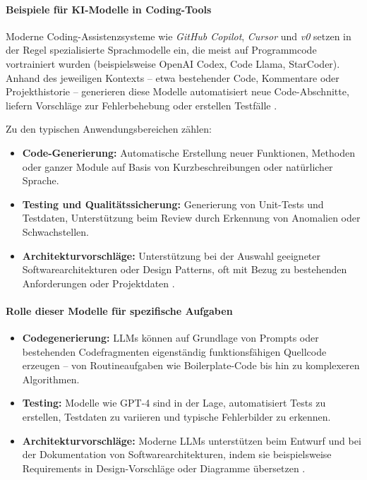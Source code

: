 \paragraph{Beispiele für KI-Modelle in Coding-Tools}

Moderne Coding-Assistenzsysteme wie \textit{GitHub Copilot}, \textit{Cursor}
und \textit{v0} setzen in der Regel spezialisierte Sprachmodelle ein, die meist
auf Programmcode vortrainiert wurden (beispielsweise OpenAI Codex, Code Llama,
StarCoder). Anhand des jeweiligen Kontexts – etwa bestehender Code, Kommentare
oder Projekthistorie – generieren diese Modelle automatisiert neue
Code-Abschnitte, liefern Vorschläge zur Fehlerbehebung oder erstellen Testfälle
\cite{coutinho_role_2024, esposito_generative_2025}.

Zu den typischen Anwendungsbereichen zählen:
\begin{itemize}
    \item \textbf{Code-Generierung:} Automatische Erstellung neuer Funktionen, Methoden oder ganzer Module auf Basis von Kurzbeschreibungen oder natürlicher Sprache.
    \item \textbf{Testing und Qualitätssicherung:} Generierung von Unit-Tests und Testdaten, Unterstützung beim Review durch Erkennung von Anomalien oder Schwachstellen.
    \item \textbf{Architekturvorschläge:} Unterstützung bei der Auswahl geeigneter Softwarearchitekturen oder Design Patterns, oft mit Bezug zu bestehenden Anforderungen oder Projektdaten \cite{esposito_generative_2025}.
\end{itemize}

\paragraph{Rolle dieser Modelle für spezifische Aufgaben}

\begin{itemize}
    \item \textbf{Codegenerierung:} LLMs können auf Grundlage von Prompts oder bestehenden Codefragmenten eigenständig funktionsfähigen Quellcode erzeugen – von Routineaufgaben wie Boilerplate-Code bis hin zu komplexeren Algorithmen.
    \item \textbf{Testing:} Modelle wie GPT-4 sind in der Lage, automatisiert Tests zu erstellen, Testdaten zu variieren und typische Fehlerbilder zu erkennen.
    \item \textbf{Architekturvorschläge:} Moderne LLMs unterstützen beim Entwurf und bei der Dokumentation von Softwarearchitekturen, indem sie beispielsweise Requirements in Design-Vorschläge oder Diagramme übersetzen \cite{esposito_generative_2025, nguyen-duc_generative_2023}.
\end{itemize}

